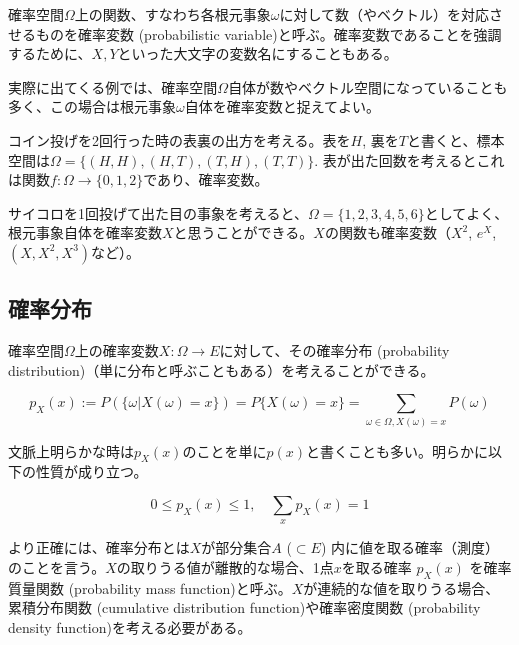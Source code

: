 \documentclass[uplatex,dvipdfmx]{jlreq}
\newcommand\term[1]{\textsf{#1}}
\begin{document}
確率空間$\Omega$上の関数、すなわち各根元事象$\omega$に対して数（やベクトル）を対応させるものを\term{確率変数 (probabilistic variable)}と呼ぶ。確率変数であることを強調するために、$X, Y$といった大文字の変数名にすることもある。

実際に出てくる例では、確率空間$\Omega$自体が数やベクトル空間になっていることも多く、この場合は根元事象$\omega$自体を確率変数と捉えてよい。

\begin{example}
    コイン投げを2回行った時の表裏の出方を考える。表を$H$, 裏を$T$と書くと、標本空間は$\Omega=\{(H, H), (H, T), (T, H), (T, T)\}$. 表が出た回数を考えるとこれは関数$f\colon \Omega \to \{0, 1, 2\}$であり、確率変数。
\end{example}

\begin{example}
    サイコロを1回投げて出た目の事象を考えると、$\Omega=\{1, 2, 3, 4, 5, 6\}$としてよく、根元事象自体を確率変数$X$と思うことができる。$X$の関数も確率変数（$X^2$, $e^X$, $(X, X^2, X^3)$など）。
\end{example}

\subsection{確率分布}

確率空間$\Omega$上の確率変数$X\colon \Omega \to E$に対して、その\term{確率分布 (probability distribution)}（単に分布と呼ぶこともある）を考えることができる。

\begin{equation}
    p_X(x) := P(\{\omega | X(\omega) = x\})
    = P\{X(\omega) = x\}
    = \sum_{\omega \in \Omega, X(\omega) = x} P(\omega)
\end{equation}

文脈上明らかな時は$p_X(x)$のことを単に$p(x)$と書くことも多い。明らかに以下の性質が成り立つ。

\begin{equation}
    0 \leq p_X(x) \leq 1, \quad \sum_x p_X(x) = 1
\end{equation}

\begin{note}
    より正確には、確率分布とは$X$が部分集合$A$ ($\subset E$) 内に値を取る確率（測度）のことを言う。$X$の取りうる値が離散的な場合、1点$x$を取る確率 $p_X(x)$ を\term{確率質量関数 (probability mass function)}と呼ぶ。$X$が連続的な値を取りうる場合、\term{累積分布関数 (cumulative distribution function)}や\term{確率密度関数 (probability density function)}を考える必要がある。
\end{note}
\end{document}
